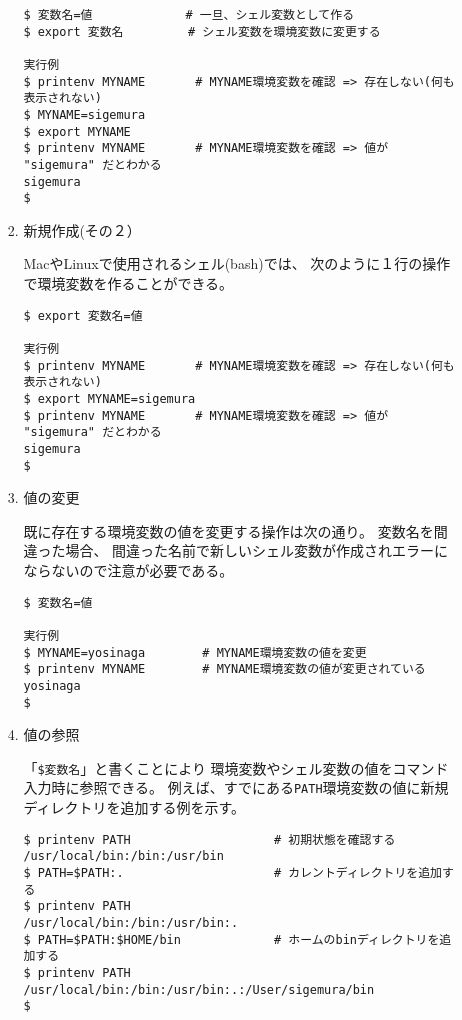 \documentclass[a4j,dvipdfmx]{jarticle}
\begin{document}
\begin{enumerate}
\begin{enumerate}
\begin{enumerate}
\begin{lstlisting}[numbers=none]
$ 変数名=値             # 一旦、シェル変数として作る
$ export 変数名         # シェル変数を環境変数に変更する

実行例
$ printenv MYNAME       # MYNAME環境変数を確認 => 存在しない(何も表示されない)
$ MYNAME=sigemura
$ export MYNAME
$ printenv MYNAME       # MYNAME環境変数を確認 => 値が "sigemura" だとわかる
sigemura
$
\end{lstlisting}

\item 新規作成(その２）

MacやLinuxで使用されるシェル(bash)では、
次のように１行の操作で環境変数を作ることができる。

\begin{lstlisting}[numbers=none]
$ export 変数名=値

実行例
$ printenv MYNAME       # MYNAME環境変数を確認 => 存在しない(何も表示されない)
$ export MYNAME=sigemura
$ printenv MYNAME       # MYNAME環境変数を確認 => 値が "sigemura" だとわかる
sigemura
$
\end{lstlisting}

\item 値の変更

既に存在する環境変数の値を変更する操作は次の通り。
変数名を間違った場合、
間違った名前で新しいシェル変数が作成されエラーにならないので注意が必要である。

\begin{lstlisting}[numbers=none]
$ 変数名=値

実行例
$ MYNAME=yosinaga        # MYNAME環境変数の値を変更
$ printenv MYNAME        # MYNAME環境変数の値が変更されている
yosinaga
$
\end{lstlisting}

\item 値の参照

「\verb/$変数名/」と書くことにより
環境変数やシェル変数の値をコマンド入力時に参照できる。
例えば、すでにある\verb/PATH/環境変数の値に新規ディレクトリを追加する例を示す。
\begin{lstlisting}[numbers=none]
$ printenv PATH                    # 初期状態を確認する
/usr/local/bin:/bin:/usr/bin
$ PATH=$PATH:.                     # カレントディレクトリを追加する
$ printenv PATH
/usr/local/bin:/bin:/usr/bin:.
$ PATH=$PATH:$HOME/bin             # ホームのbinディレクトリを追加する
$ printenv PATH
/usr/local/bin:/bin:/usr/bin:.:/User/sigemura/bin
$
\end{lstlisting}


\end{enumerate}
\end{enumerate}
\end{enumerate}
\end{document}
